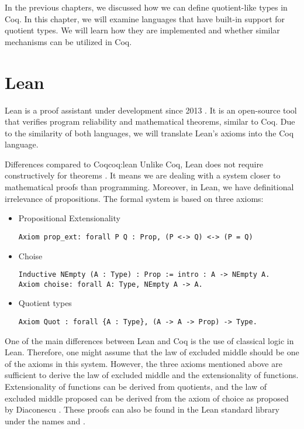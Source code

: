 In the previous chapters, we discussed how we can define quotient-like types in Coq. In this chapter, we will examine languages that have built-in support for quotient types. We will learn how they are implemented and whether similar mechanisms can be utilized in Coq.
\section{Lean}
Lean is a proof assistant under development since 2013 \cite{lean4}. It is an open-source tool that verifies program reliability and mathematical theorems, similar to Coq. Due to the similarity of both languages, we will translate Lean's axioms into the Coq language.
\begin{coq}{Differences compared to Coq}{coq:lean}
Unlike Coq, Lean does not require constructively for theorems \cite{lean4}. It means we are dealing with a system closer to mathematical proofs than programming. Moreover, in Lean, we have definitional irrelevance of propositions. The formal system is based on three axioms:
\begin{itemize}
    \item{Propositional Extensionality}
\begin{verbatim}
Axiom prop_ext: forall P Q : Prop, (P <-> Q) <-> (P = Q)
\end{verbatim}
    \item{Choise}
\begin{verbatim}
Inductive NEmpty (A : Type) : Prop := intro : A -> NEmpty A.
Axiom choise: forall A: Type, NEmpty A -> A.
\end{verbatim}
    \item{Quotient types}
\begin{verbatim}
Axiom Quot : forall {A : Type}, (A -> A -> Prop) -> Type.
\end{verbatim}
\end{itemize}
One of the main differences between Lean and Coq is the use of classical logic in Lean. Therefore, one might assume that the law of excluded middle should be one of the axioms in this system. However, the three axioms mentioned above are sufficient to derive the law of excluded middle and the extensionality of functions. Extensionality of functions can be derived from quotients, and the law of excluded middle proposed can be derived from the axiom of choice as proposed by Diaconescu \cite{choise}. These proofs can also be found in the Lean standard library under the names  and .
\end{coq}
